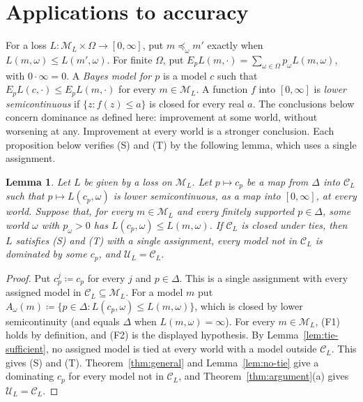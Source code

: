 \documentclass[11pt]{article}
\newtheorem{lemma}[theorem]{Lemma}
\theoremstyle{definition}
\theoremstyle{remark}
\newcommand{\M}{\mathcal M}
\newcommand{\C}{\mathcal C}
\newcommand{\U}{\mathcal U}
\begin{document}
\section{Applications to accuracy}\label{sec:short-applications}
For a loss $L:\M_L\times\Omega\to[0,\infty]$, put $m\preceq_\omega m'$ exactly when $L(m,\omega)\le L(m',\omega)$. For finite $\Omega$, put $E_pL(m,\cdot)=\sum_{\omega\in\Omega}p_\omega L(m,\omega)$, with $0\cdot\infty=0$. A \emph{Bayes model for $p$} is a model $c$ such that $E_pL(c,\cdot)\le E_pL(m,\cdot)$ for every $m\in\M_L$. A function $f$ into $[0,\infty]$ is \emph{lower semicontinuous} if $\{z:f(z)\le a\}$ is closed for every real $a$. The conclusions below concern dominance as defined here: improvement at some world, without worsening at any. Improvement at every world is a stronger conclusion. {\color{red}Each proposition below verifies {\color{red}(S)} and {\color{red}(T)} by the following lemma, which uses a single assignment.}

\begingroup\color{red}
\begin{lemma}\label{lem:loss-selection}
Let $L$ be given by a loss on $\M_L$. Let $p\mapsto c_p$ be a map from $\Delta$ into $\C_L$ such that $p\mapsto L(c_p,\omega)$ is lower semicontinuous, as a map into $[0,\infty]$, at every world. Suppose that, for every $m\in\M_L$ and every finitely supported $p\in\Delta$, some world $\omega$ with $p_\omega>0$ has $L(c_p,\omega)\le L(m,\omega)$. If $\C_L$ is closed under ties, then $L$ satisfies (S) and (T) with a single assignment, every model not in $\C_L$ is dominated by some $c_p$, and $\U_L=\C_L$.
\end{lemma}
\begin{proof}
Put $c^j_p\coloneqq c_p$ for every $j$ and $p\in\Delta$. This is a single assignment with every assigned model in $\C_L\subseteq\M_L$. For a model $m$ put $A_\omega(m)\coloneqq\{p\in\Delta:L(c_p,\omega)\le L(m,\omega)\}$, which is closed by lower semicontinuity (and equals $\Delta$ when $L(m,\omega)=\infty$). For every $m\in\M_L$, (F1) holds by definition, and (F2) is the displayed hypothesis. By Lemma~\ref{lem:tie-sufficient}, no assigned model is tied at every world with a model outside $\C_L$. This gives (S) and (T). Theorem~\ref{thm:general} and Lemma~\ref{lem:no-tie} give a dominating $c_p$ for every model not in $\C_L$, and Theorem~\ref{thm:argument}(a) gives $\U_L=\C_L$.
\end{proof}
\endgroup
\end{document}
